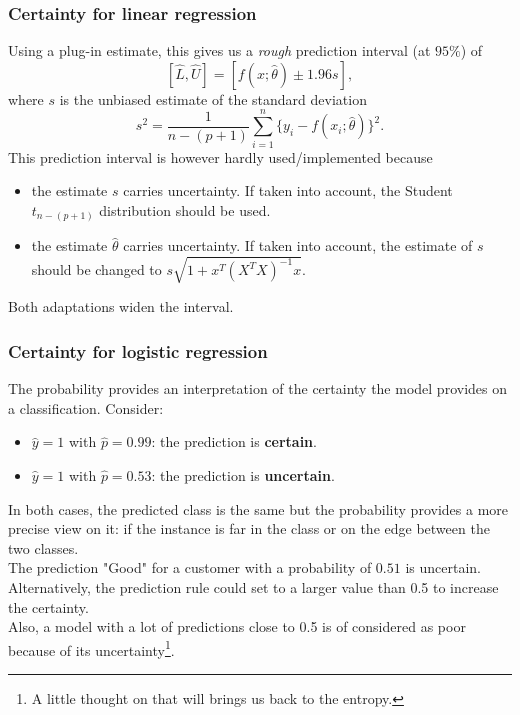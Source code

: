 \begin{frame}
\frametitle{Certainty for linear regression}
Using a plug-in estimate, this gives us a {\it rough} prediction interval (at $95\%$) of
$$
\left[\hat{L},\hat{U}\right] = \left[f(x;\hat{\theta}) \pm 1.96 s\right], 
$$
where $s$ is the unbiased estimate of the standard deviation
$$
s^2 = \frac{1}{n-(p+1)} \sum_{i=1}^n \{y_i - f(x_i;\hat{\theta})\}^2.
$$
This prediction interval is however hardly used/implemented because
\begin{itemize}
\item the estimate $s$ carries uncertainty. If taken into account, the Student $t_{n-(p+1)}$ distribution should be used.
\item the estimate $\hat{\theta}$ carries uncertainty. If taken into account, the estimate of $s$ should be changed to $s \sqrt{1+x^T(X^TX)^{-1}x}$.
\end{itemize}
Both adaptations widen the interval. 
\end{frame}
\begin{frame}
\frametitle{Certainty for logistic regression}
The probability provides an interpretation of the certainty the model provides on a classification. Consider: 
\begin{itemize}
\item $\hat{y}=1$ with $\hat{p} = 0.99$: the prediction is {\bf certain}.
\item $\hat{y}=1$ with $\hat{p} = 0.53$: the prediction is {\bf uncertain}.
\end{itemize}
In both cases, the predicted class is the same but the probability provides a more precise view on it: if the instance is far in the class or on the edge between the two classes.\\
\vspace{0.2cm}
The prediction "Good" for a customer with a probability of $0.51$ is uncertain. Alternatively, the prediction rule could set to a larger value than 0.5 to increase the certainty. \\
\vspace{0.2cm}
Also, a model with a lot of predictions close to 0.5 is of considered as poor because of its uncertainty\footnote{A little thought on that will brings us back to the entropy.}.
\end{frame}
